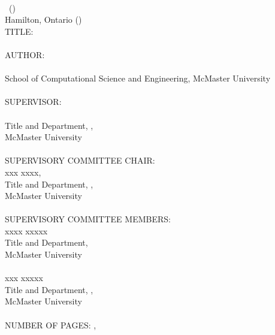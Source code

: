 \documentclass[
11pt, %
oneside, %
english, %
singlespacing, %
]{McMasterThesis} %
\begin{document}
\newpage
{} %
\setcounter{page}{2} %

\noindent %
\univname \\ 
\degreename\, (\the\year) \\
Hamilton, Ontario (\deptname) \\[1.5cm]
TITLE: \ttitle 
\\ \\
AUTHOR:\\ \authorname\,\\ 
School of Computational Science and Engineering, McMaster University %
\\ \\
SUPERVISOR:\\ \supname\,\\
Title and Department, , \\
McMaster University
\\ 
\\
SUPERVISORY COMMITTEE CHAIR: \\ xxx xxxx,\\
Title and Department, , \\
McMaster University 
\\
\\
SUPERVISORY COMMITTEE MEMBERS: \\xxxx xxxxx\\ 
Title and Department, \\
McMaster University
\\
\\
xxx xxxxx\\ 
Title and Department, , \\
McMaster University  
\\
\\
NUMBER OF PAGES: \pageref{lastoffront}, \pageref{LastPage}  %

\clearpage



\end{document}
